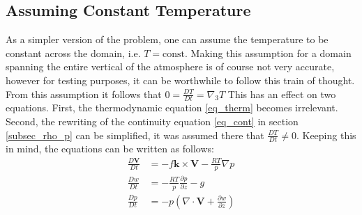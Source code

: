\subsection{Assuming Constant Temperature}
As a simpler version of the problem, one can assume the temperature to be constant across the domain, i.e. $T=\text{const}$.
Making this assumption for a domain spanning the entire vertical of the atmosphere is of course not very accurate, however for testing purposes, it can be worthwhile to follow this train of thought.
From this assumption it follows that $0=\frac{DT}{Dt}=\nabla _3T$
This has an effect on two equations.
First, the thermodynamic equation \ref{eq_therm} becomes irrelevant.
Second, the rewriting of the continuity equation \ref{eq_cont} in section \ref{subsec_rho_p} can be simplified, it was assumed there that $\frac{DT}{Dt}\neq 0$.
Keeping this in mind, the equations can be written as follows:
\begin{align*}
\frac{D\textbf{V}}{Dt} &= -f\boldsymbol{k} \times \textbf{V} - \frac{RT}{p}\nabla p\\
\frac{Dw}{Dt} &= - \frac{RT}{p} \frac{\partial p}{\partial z} - g \\
\frac{Dp}{Dt} &= -p (\nabla \cdot \textbf{V} + \frac{\partial w}{\partial z})
\end{align*}

